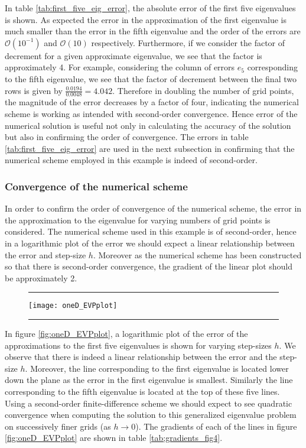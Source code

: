 \documentclass[a4paper, 12pt, twoside, openright]{article}
\numberwithin{equation}{section}
\begin{document}
In table \ref{tab:first_five_eig_error}, the absolute error of the first five eigenvalues is shown. As expected the error in the approximation of the first eigenvalue is much smaller than the error in the fifth eigenvalue and the order of the errors are $\mathcal{O}(10^{-1})$ and $\mathcal{O}(10)$ respectively. Furthermore, if we consider the factor of decrement for a given approximate eigenvalue, we see that the factor is approximately 4. For example, considering the column of errors $e_5$ corresponding to the fifth eigenvalue, we see that the factor of decrement between the final two rows is given by $\frac{0.0194}{0.0048}=4.042$. Therefore in doubling the number of grid points, the magnitude of the error decreases by a factor of four, indicating the numerical scheme is working as intended with second-order convergence. Hence error of the numerical solution is useful not only in calculating the accuracy of the solution but also in confirming the order of convergence. The errors in table \ref{tab:first_five_eig_error} are used in the next subsection in confirming that the numerical scheme employed in this example is indeed of second-order. %

\subsubsection{Convergence of the numerical scheme}

In order to confirm the order of convergence of the numerical scheme, the error in the approximation to the eigenvalue for varying numbers of grid points is considered. The numerical scheme used in this example is of second-order, hence in a logarithmic plot of the error we should expect a linear relationship between the error and step-size $h$. Moreover as the numerical scheme has been constructed so that there is second-order convergence, the gradient of the linear plot should be approximately 2.   

\begin{figure}[h]
\centering
\rule{\linewidth}{1.5pt}
\texttt{[image: oneD\_EVPplot]} 
\rule{\linewidth}{1.5pt}
\end{figure}

In figure \ref{fig:oneD_EVPplot}, a logarithmic plot of the error of the approximations to the first five eigenvalues is shown for varying step-sizes $h$. We observe that there is indeed a linear relationship between the error and the step-size $h$. Moreover, the line corresponding to the first eigenvalue is located lower down the plane as the error in the first eigenvalue is smallest. Similarly the line corresponding to the fifth eigenvalue is located at the top of these five lines. Using a second-order finite-difference scheme we should expect to see quadratic convergence when computing the solution to this generalized eigenvalue problem on successively finer grids (as $h\rightarrow0$). The gradients of each of the lines in figure \ref{fig:oneD_EVPplot} are shown in table \ref{tab;gradients_fig4}. 
\end{document}
